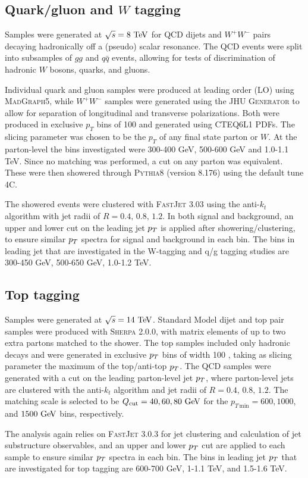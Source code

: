 \subsection{Quark/gluon and $W$ tagging}

Samples were generated at $\sqrt{s} = 8\TeV$ for QCD dijets and $W^+W^-$
pairs decaying hadronically off a (pseudo) scalar resonance. The QCD events
were split into subsamples of $gg$ and $q\bar{q}$ events, allowing for tests of
discrimination of hadronic $W$ bosons, quarks, and gluons.

Individual quark and gluon samples were produced at leading order (LO)
using \textsc{MadGraph5}, while $W^+W^-$ samples were generated using
the \textsc{JHU Generator} to allow for separation of longitudinal and
transverse polarizations. Both were produced in exclusive $p_T$ bins
of 100 {\GeV} and generated using \textsc{CTEQ6L1} PDFs. The slicing parameter
was chosen to be the $p_T$ of any final state parton or $W$. At the
parton-level the \pt bins investigated were 300-400 GeV, 500-600 GeV
and 1.0-1.1 TeV. Since
no matching was performed, a cut on any parton was equivalent. These were
then showered through \textsc{Pythia8} (version 8.176) using the default tune 4C.

The showered events were clustered with \textsc{FastJet} 3.03 using
the anti-$k_t$ algorithm with jet radii of $R = 0.4,\, 0.8,\, 1.2$. In
both signal and background, an upper and lower cut on
the leading jet $p_T$ is applied after showering/clustering, to ensure
similar $p_T$ spectra for signal and background in each bin. The bins
in leading jet \pt that are investigated in the W-tagging and
q/g tagging studies are 300-450 GeV, 500-650 GeV, 1.0-1.2 TeV.

\subsection{Top tagging}
Samples were generated at $\sqrt{s}=14\TeV$. Standard Model dijet and top pair
samples were produced with \textsc{Sherpa} 2.0.0, with matrix elements of up
to two extra partons matched to the shower. The top samples included only
hadronic decays and  were generated in exclusive $p_T$ bins of width 100 \GeV,
taking as slicing parameter the maximum of the top/anti-top $p_T$. The QCD
samples were generated with a cut on the leading parton-level jet $p_T$, where
parton-level jets are clustered with the anti-$k_t$ algorithm and jet radii of
$R= 0.4,\,0.8,\,1.2$. The matching scale is selected to be $Q_{\rm cut}=40, 60, 80 \GeV$ for
the $p_{T\,\text{min}}=600, 1000$, and $1500 \GeV$ bins, respectively.
 
The analysis again relies on \textsc{FastJet} 3.0.3 for jet clustering and
calculation of jet substructure observables, and an upper and lower $p_T$ cut are applied
to each sample to ensure similar $p_T$ spectra in each bin. The bins in leading jet $p_T$
that are investigated for top tagging are 600-700 GeV, 1-1.1 TeV, and 1.5-1.6 TeV.